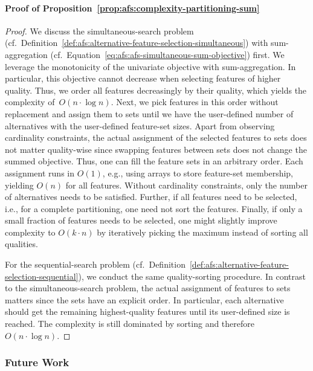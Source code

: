 \documentclass{article}
\theoremstyle{definition}
\begin{document}
\paragraph{Proof of Proposition~\ref{prop:afs:complexity-partitioning-sum}}
%
\begin{proof}
We discuss the simultaneous-search problem (cf.~Definition~\ref{def:afs:alternative-feature-selection-simultaneous}) with sum-aggregation (cf.~Equation~\ref{eq:afs:afs-simultaneous-sum-objective}) first.
We leverage the monotonicity of the univariate objective with sum-aggregation.
In particular, this objective cannot decrease when selecting features of higher quality.
Thus, we order all features decreasingly by their quality, which yields the complexity of~$O(n \cdot \log n)$.
Next, we pick features in this order without replacement and assign them to sets until we have the user-defined number of alternatives with the user-defined feature-set sizes.
Apart from observing cardinality constraints, the actual assignment of the selected features to sets does not matter quality-wise since swapping features between sets does not change the summed objective.
Thus, one can fill the feature sets in an arbitrary order.
Each assignment runs in $O(1)$, e.g., using arrays to store feature-set membership, yielding $O(n)$ for all features.
Without cardinality constraints, only the number of alternatives needs to be satisfied.
Further, if all features need to be selected, i.e., for a complete partitioning, one need not sort the features.
Finally, if only a small fraction of features needs to be selected, one might slightly improve complexity to $O(k \cdot n)$ by iteratively picking the maximum instead of sorting all qualities.

For the sequential-search problem (cf.~Definition~\ref{def:afs:alternative-feature-selection-sequential}), we conduct the same quality-sorting procedure.
In contrast to the simultaneous-search problem, the actual assignment of features to sets matters since the sets have an explicit order.
In particular, each alternative should get the remaining highest-quality features until its user-defined size is reached.
The complexity is still dominated by sorting and therefore~$O(n \cdot \log n)$.
\end{proof}

\subsubsection{Future Work}
\label{sec:afs:appendix:complexity:future-work}
\end{document}
